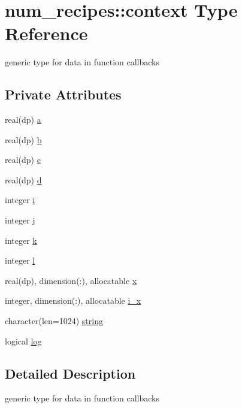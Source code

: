 \hypertarget{structnum__recipes_1_1context}{}\section{num\+\_\+recipes\+:\+:context Type Reference}
\label{structnum__recipes_1_1context}


generic type for data in function callbacks  


\subsection*{Private Attributes}
\begin{DoxyCompactItemize}
\item 
real(dp) \hyperlink{structnum__recipes_1_1context_abe465f03a420945775d19d43885825cd}{a}
\item 
real(dp) \hyperlink{structnum__recipes_1_1context_ad615b3fc2788a283541da33d6741bf46}{b}
\item 
real(dp) \hyperlink{structnum__recipes_1_1context_aefef8a5b93ee36537e18c76ea4554c57}{c}
\item 
real(dp) \hyperlink{structnum__recipes_1_1context_ac2db64d9f0e2e32f17ac01136e0fb81e}{d}
\item 
integer \hyperlink{structnum__recipes_1_1context_aa5e0b4a8d889230e24ecf2e901fa1935}{i}
\item 
integer \hyperlink{structnum__recipes_1_1context_a6a1d84258aecc835a37078565b8fb540}{j}
\item 
integer \hyperlink{structnum__recipes_1_1context_a467f8920bc7f044d358aca15e86e82ba}{k}
\item 
integer \hyperlink{structnum__recipes_1_1context_a1f33ef9a1bf500d3bd645d43501799a5}{l}
\item 
real(dp), dimension(\+:), allocatable \hyperlink{structnum__recipes_1_1context_ab44c8a3ce488085f9a0ebcdf5a714437}{x}
\item 
integer, dimension(\+:), allocatable \hyperlink{structnum__recipes_1_1context_a76736c51070a2e217f851ca1024720e5}{i\+\_\+x}
\item 
character(len=1024) \hyperlink{structnum__recipes_1_1context_ad9d0b355e2db0a3482bc3f0777ed090f}{string}
\item 
logical \hyperlink{structnum__recipes_1_1context_a9d0a1aae628cceadd57fe6f3781c69af}{log}
\end{DoxyCompactItemize}


\subsection{Detailed Description}
generic type for data in function callbacks 

